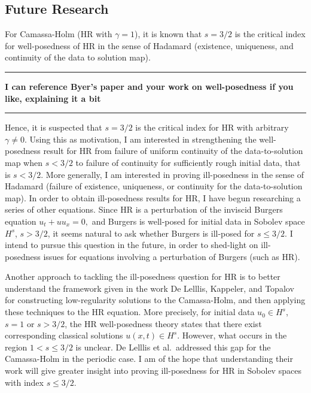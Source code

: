 \documentclass[12pt,reqno]{amsart}
\begin{document}
\subsection{Future Research} 
\label{ssec:fut-res}
For Camassa-Holm (HR with $\gamma =1$), it is known that $s = 3/2$ is the critical index for well-posedness of HR
in the sense of Hadamard (existence, uniqueness, and continuity of the data to solution map).
\hrule
\textbf{I can reference Byer's paper and your work on well-posedness if you like, explaining it a bit}
\hrule
Hence, it is suspected that $s = 3/2$ is the critical index for HR with arbitrary $\gamma \neq 0$.
Using this as motivation, I am interested in strengthening the well-posedness
result for HR from failure of uniform continuity of the data-to-solution map
when $s<3/2$ to failure of continuity for sufficiently rough initial data,  that
is $s<3/2$.
More generally, I am interested in proving
ill-posedness in the sense of Hadamard (failure of existence, uniqueness, or
continuity for the data-to-solution map). In order to obtain ill-posedness
results for HR, I have begun researching a series of other equations. Since HR is a perturbation of the
inviscid Burgers  equation
$
    u_{t} + u u_{x} = 0,
$
and Burgers is well-posed for initial data in Sobolev space $H^{s}$, $s > 3/2$,
it seems natural to ask whether Burgers is ill-posed for $s \le 3/2$. I intend to
pursue this question in the future, in order to shed-light on ill-posedness
issues for equations involving a perturbation of Burgers (such as HR).

Another approach to tackling the ill-posedness question for HR
is to better understand the framework given in the work De Lelllis,
Kappeler, and Topalov \cite{Lellis_2007_Low-regularity-} for constructing
low-regularity solutions to the Camassa-Holm, and then applying these techniques
to the HR equation. More precisely, for initial data $u_{0} \in H^{s}$, $s =1$
or $s > 3/2$, the HR well-posedness theory states that there exist corresponding
classical solutions $u(x,t) \in H^{s}$. However, what occurs in the region $1 <
s \le 3/2$ is unclear. De Lelllis et al.\ addressed this gap for the
Camassa-Holm in the periodic case. I am of the hope that understanding their
work will give greater insight into proving ill-posedness for HR in Sobolev
spaces with index $s \le 3/2$. 
\end{document}
